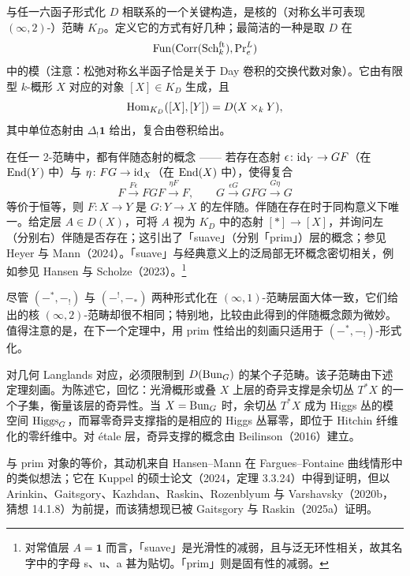 \begin{remark}
与任一六函子形式化 $D$ 相联系的一个关键构造，是核的（对称幺半可表现 $(\infty,2)$-）范畴 $K_D$。定义它的方式有好几种；最简洁的一种是取 $D$ 在
\[
\operatorname{Fun}(\mathrm{Corr}(\mathrm{Sch}^{\mathrm{ft}}_k),\mathrm{Pr}^{L}_e)
\]
中的模（注意：松弛对称幺半函子恰是关于 Day 卷积的交换代数对象）。它由有限型 $k$-概形 $X$ 对应的对象 $[X]\in K_D$ 生成，且
\[
\operatorname{Hom}_{K_D}([X],[Y])=D(X\times_k Y),
\]
其中单位态射由 $\Delta_!\mathbf{1}$ 给出，复合由卷积给出。

在任一 2-范畴中，都有伴随态射的概念 —— 若存在态射 $\epsilon\colon\mathrm{id}_Y\to GF$（在 $\operatorname{End}(Y)$ 中）与 $\eta\colon FG\to\mathrm{id}_X$（在 $\operatorname{End}(X)$ 中），使得复合
\[
F\xrightarrow{F\epsilon}FGF\xrightarrow{\eta F}F,\qquad
G\xrightarrow{\epsilon G}GFG\xrightarrow{G\eta}G
\]
等价于恒等，则 $F\colon X\to Y$ 是 $G\colon Y\to X$ 的左伴随。伴随在存在时于同构意义下唯一。给定层 $A\in D(X)$，可将 $A$ 视为 $K_D$ 中的态射 $[*]\to[X]$，并询问左（分别右）伴随是否存在；这引出了「suave」（分别「prim」）层的概念；参见 Heyer 与 Mann（2024）。「suave」与经典意义上的泛局部无环概念密切相关，例如参见 Hansen 与 Scholze（2023）。\footnote{对常值层 $A=\mathbf{1}$ 而言，「suave」是光滑性的减弱，且与泛无环性相关，故其名字中的字母 s、u、a 甚为贴切。「prim」则是固有性的减弱。}
\end{remark}

\begin{remark}
尽管 $(-^*,-_!)$ 与 $(-^!,-_*)$ 两种形式化在 $(\infty,1)$-范畴层面大体一致，它们给出的核 $(\infty,2)$-范畴却很不相同；特别地，比较由此得到的伴随概念颇为微妙。值得注意的是，在下一个定理中，用 prim 性给出的刻画只适用于 $(-^*,-_!)$-形式化。
\end{remark}

对几何 Langlands 对应，必须限制到 $D(\operatorname{Bun}_G)$ 的某个子范畴。该子范畴由下述定理刻画。为陈述它，回忆：光滑概形或叠 $X$ 上层的奇异支撑是余切丛 $T^*X$ 的一个子集，衡量该层的奇异性。当 $X=\operatorname{Bun}_G$ 时，余切丛 $T^*X$ 成为 Higgs 丛的模空间 $\operatorname{Higgs}_G$，而幂零奇异支撑指的是相应的 Higgs 丛幂零，即位于 Hitchin 纤维化的零纤维中。对 étale 层，奇异支撑的概念由 Beilinson（2016）建立。

与 prim 对象的等价，其动机来自 Hansen--Mann 在 Fargues--Fontaine 曲线情形中的类似想法；它在 Kuppel 的硕士论文（2024，定理 3.3.24）中得到证明，但以 Arinkin、Gaitsgory、Kazhdan、Raskin、Rozenblyum 与 Varshavsky（2020b，猜想 14.1.8）为前提，而该猜想现已被 Gaitsgory 与 Raskin（2025a）证明。

